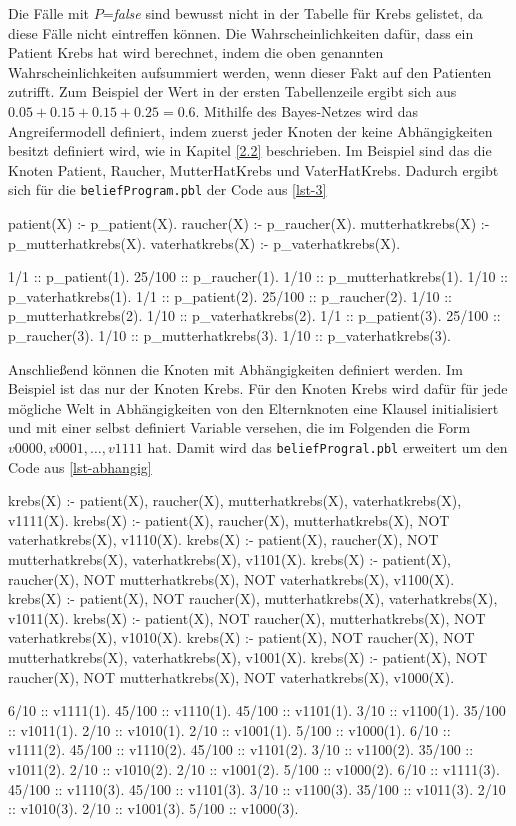 \documentclass[german,version-2020-11]{uzl-thesis}
\begin{document}
Die Fälle mit $P$=\textit{false} sind bewusst nicht in der Tabelle für Krebs gelistet, da diese Fälle nicht eintreffen können. Die Wahrscheinlichkeiten dafür, dass ein Patient Krebs hat wird berechnet, indem die oben genannten Wahrscheinlichkeiten aufsummiert werden, wenn dieser Fakt auf den Patienten zutrifft. Zum Beispiel der Wert in der ersten Tabellenzeile ergibt sich aus $0.05 + 0.15 + 0.15 +0.25 = 0.6$.
Mithilfe des Bayes-Netzes wird das Angreifermodell definiert, indem zuerst jeder Knoten der keine Abhängigkeiten besitzt definiert wird, wie in Kapitel \cref{2.2} beschrieben. Im Beispiel sind das die Knoten Patient, Raucher, MutterHatKrebs und VaterHatKrebs. Dadurch ergibt sich für die \texttt{beliefProgram.pbl} der Code aus \autoref{lst-3}
\begin{Pseudocode}[caption={Beispiel für Knoten ohne Abhängigkeiten }, label={lst-3}, numbers=left]
patient(X) :- p_patient(X).
raucher(X) :- p_raucher(X).
mutterhatkrebs(X) :- p_mutterhatkrebs(X).
vaterhatkrebs(X) :- p_vaterhatkrebs(X).
	
1/1 :: p_patient(1).
25/100 :: p_raucher(1).
1/10 :: p_mutterhatkrebs(1).
1/10 :: p_vaterhatkrebs(1).
1/1 :: p_patient(2).
25/100 :: p_raucher(2).
1/10 :: p_mutterhatkrebs(2).
1/10 :: p_vaterhatkrebs(2).
1/1 :: p_patient(3).
25/100 :: p_raucher(3).
1/10 :: p_mutterhatkrebs(3).
1/10 :: p_vaterhatkrebs(3).
\end{Pseudocode}
Anschließend können die Knoten mit Abhängigkeiten definiert werden. Im Beispiel ist das nur der Knoten Krebs. Für den Knoten Krebs wird dafür für jede mögliche Welt in Abhängigkeiten von den Elternknoten eine Klausel initialisiert und mit einer selbst definiert Variable versehen, die im Folgenden die Form $v0000, v0001, \dots , v1111$ hat. Damit wird das \texttt{beliefProgral.pbl} erweitert um den Code aus \autoref{lst-abhangig} 
\begin{Pseudocode}[caption={Beispiel für Knoten mit Abhängigkeiten }, label={lst-abhangig}, numbers=left]
krebs(X) :- patient(X), raucher(X), mutterhatkrebs(X), vaterhatkrebs(X), v1111(X).
krebs(X) :- patient(X), raucher(X), mutterhatkrebs(X), NOT vaterhatkrebs(X), v1110(X).
krebs(X) :- patient(X), raucher(X), NOT mutterhatkrebs(X), vaterhatkrebs(X), v1101(X).
krebs(X) :- patient(X), raucher(X), NOT mutterhatkrebs(X), NOT vaterhatkrebs(X), v1100(X).
krebs(X) :- patient(X), NOT raucher(X), mutterhatkrebs(X), vaterhatkrebs(X), v1011(X).
krebs(X) :- patient(X), NOT raucher(X), mutterhatkrebs(X), NOT vaterhatkrebs(X), v1010(X).
krebs(X) :- patient(X), NOT raucher(X), NOT mutterhatkrebs(X), vaterhatkrebs(X), v1001(X).
krebs(X) :- patient(X), NOT raucher(X), NOT mutterhatkrebs(X), NOT vaterhatkrebs(X), v1000(X).

6/10 :: v1111(1).
45/100 :: v1110(1).
45/100 :: v1101(1).
3/10 :: v1100(1).
35/100 :: v1011(1).
2/10 :: v1010(1).
2/10 :: v1001(1).
5/100 :: v1000(1).
6/10 :: v1111(2).
45/100 :: v1110(2).
45/100 :: v1101(2).
3/10 :: v1100(2).
35/100 :: v1011(2).
2/10 :: v1010(2).
2/10 :: v1001(2).
5/100 :: v1000(2).
6/10 :: v1111(3).
45/100 :: v1110(3).
45/100 :: v1101(3).
3/10 :: v1100(3).
35/100 :: v1011(3).
2/10 :: v1010(3).
2/10 :: v1001(3).
5/100 :: v1000(3).
\end{Pseudocode}
\end{document}
